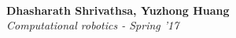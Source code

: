 \documentclass[a1,landscape]{a0poster}
\begin{document}

\begin{minipage}[b]{0.9\linewidth}
\Huge {} \color{Black}\\ %
\large \textbf{Dhasharath Shrivathsa, Yuzhong Huang}\\ %
\large \textit{Computational robotics - Spring '17}\ %
\end{minipage}


\vspace{1cm} %

\end{document}

